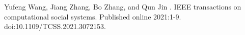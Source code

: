 \documentclass[11pt]{article}
\begin{document}
\begin{thebibliography}{}


Yufeng Wang, Jiang Zhang, Bo Zhang, and Qun Jin
.
\newblock IEEE transactions on computational social systems. Published online 2021:1-9. doi:10.1109/TCSS.2021.3072153.




\end{thebibliography}
\end{document}
